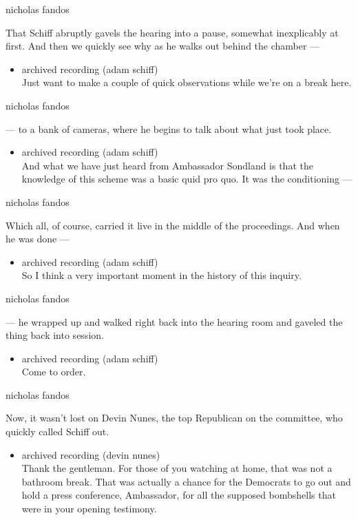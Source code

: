 nicholas fandos

That Schiff abruptly gavels the hearing into a pause, somewhat
inexplicably at first. And then we quickly see why as he walks out
behind the chamber ---

\begin{itemize}
\tightlist
\item
  archived recording (adam schiff)\\
  Just want to make a couple of quick observations while we're on a
  break here.
\end{itemize}

nicholas fandos

--- to a bank of cameras, where he begins to talk about what just took
place.

\begin{itemize}
\tightlist
\item
  archived recording (adam schiff)\\
  And what we have just heard from Ambassador Sondland is that the
  knowledge of this scheme was a basic quid pro quo. It was the
  conditioning ---
\end{itemize}

nicholas fandos

Which all, of course, carried it live in the middle of the proceedings.
And when he was done ---

\begin{itemize}
\tightlist
\item
  archived recording (adam schiff)\\
  So I think a very important moment in the history of this inquiry.
\end{itemize}

nicholas fandos

--- he wrapped up and walked right back into the hearing room and
gaveled the thing back into session.

\begin{itemize}
\tightlist
\item
  archived recording (adam schiff)\\
  Come to order.
\end{itemize}

nicholas fandos

Now, it wasn't lost on Devin Nunes, the top Republican on the committee,
who quickly called Schiff out.

\begin{itemize}
\tightlist
\item
  archived recording (devin nunes)\\
  Thank the gentleman. For those of you watching at home, that was not a
  bathroom break. That was actually a chance for the Democrats to go out
  and hold a press conference, Ambassador, for all the supposed
  bombshells that were in your opening testimony.
\end{itemize}

